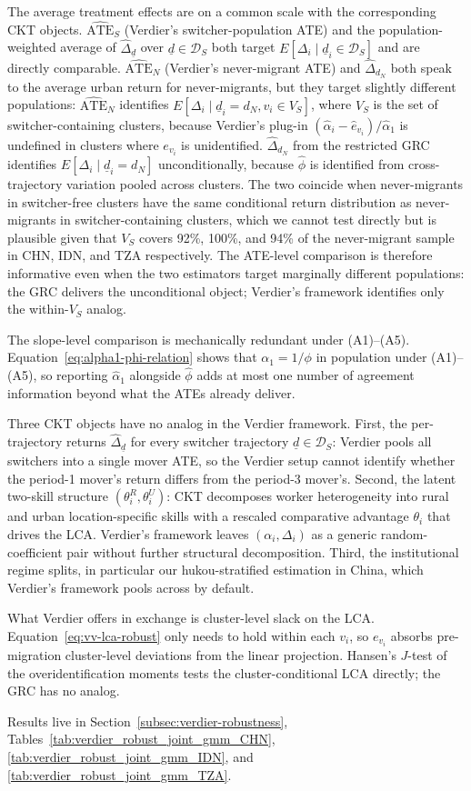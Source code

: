 The average treatment effects are on a common scale with the corresponding CKT objects.
$\widehat{\text{ATE}}_S$ (Verdier's switcher-population ATE) and the population-weighted average of $\hat\Delta_{\underline d}$ over $\underline d \in \mathcal D_S$ both target $E[\Delta_i \mid \underline d_i \in \mathcal D_S]$ and are directly comparable.
$\widehat{\text{ATE}}_N$ (Verdier's never-migrant ATE) and $\hat\Delta_{d_N}$ both speak to the average urban return for never-migrants, but they target slightly different populations: $\widehat{\text{ATE}}_N$ identifies $E[\Delta_i \mid \underline d_i = d_N, v_i \in V_S]$, where $V_S$ is the set of switcher-containing clusters, because Verdier's plug-in $(\hat\alpha_i - \hat e_{v_i})/\hat\alpha_1$ is undefined in clusters where $e_{v_i}$ is unidentified.
$\hat\Delta_{d_N}$ from the restricted GRC identifies $E[\Delta_i \mid \underline d_i = d_N]$ unconditionally, because $\hat\phi$ is identified from cross-trajectory variation pooled across clusters.
The two coincide when never-migrants in switcher-free clusters have the same conditional return distribution as never-migrants in switcher-containing clusters, which we cannot test directly but is plausible given that $V_S$ covers 92\%, 100\%, and 94\% of the never-migrant sample in CHN, IDN, and TZA respectively.
The ATE-level comparison is therefore informative even when the two estimators target marginally different populations: the GRC delivers the unconditional object; Verdier's framework identifies only the within-$V_S$ analog.

The slope-level comparison is mechanically redundant under (A1)--(A5).
Equation~\eqref{eq:alpha1-phi-relation} shows that $\alpha_1 = 1/\phi$ in population under (A1)--(A5), so reporting $\hat\alpha_1$ alongside $\hat\phi$ adds at most one number of agreement information beyond what the ATEs already deliver.

Three CKT objects have no analog in the Verdier framework.
First, the per-trajectory returns $\hat\Delta_{\underline d}$ for every switcher trajectory $\underline d \in \mathcal D_S$: Verdier pools all switchers into a single mover ATE, so the Verdier setup cannot identify whether the period-1 mover's return differs from the period-3 mover's.
Second, the latent two-skill structure $(\theta_i^R, \theta_i^U)$: CKT decomposes worker heterogeneity into rural and urban location-specific skills with a rescaled comparative advantage $\theta_i$ that drives the LCA.
Verdier's framework leaves $(\alpha_i, \Delta_i)$ as a generic random-coefficient pair without further structural decomposition.
Third, the institutional regime splits, in particular our hukou-stratified estimation in China, which Verdier's framework pools across by default.

What Verdier offers in exchange is cluster-level slack on the LCA.
Equation~\eqref{eq:vv-lca-robust} only needs to hold within each $v_i$, so $e_{v_i}$ absorbs pre-migration cluster-level deviations from the linear projection.
Hansen's $J$-test of the overidentification moments tests the cluster-conditional LCA directly; the GRC has no analog.

Results live in Section~\ref{subsec:verdier-robustness}, Tables~\ref{tab:verdier_robust_joint_gmm_CHN}, \ref{tab:verdier_robust_joint_gmm_IDN}, and \ref{tab:verdier_robust_joint_gmm_TZA}.
